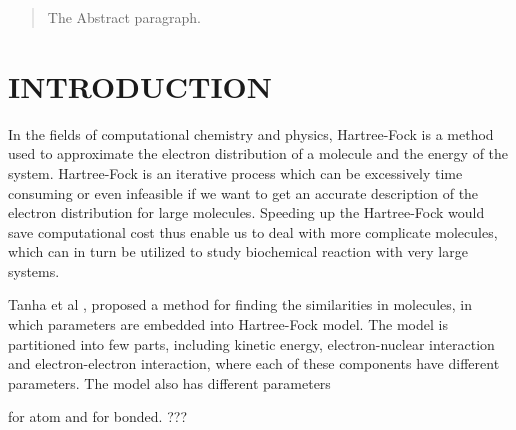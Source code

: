 \documentclass[twoside]{article}
\begin{document}
%

%


\begin{abstract}
  The Abstract paragraph.
\end{abstract}

\section{INTRODUCTION}
In the fields of computational chemistry and physics, Hartree-Fock is a method used to approximate the electron distribution of a molecule and the energy of the system. Hartree-Fock is an iterative process which can be excessively time consuming or even infeasible if we want to get an accurate description of the electron distribution for large molecules. Speeding up the Hartree-Fock would save computational cost thus enable us to deal with more complicate molecules, which can in turn be utilized to study biochemical reaction with very large systems. 

Tanha et al \cite{Matteus}, proposed a method for finding the similarities in molecules, in which parameters are embedded into Hartree-Fock model. The model is partitioned into few parts, including  kinetic energy, electron-nuclear interaction and electron-electron interaction, where each of these components have different parameters. The model also has different parameters 

for atom and for bonded. ???
\end{document}
